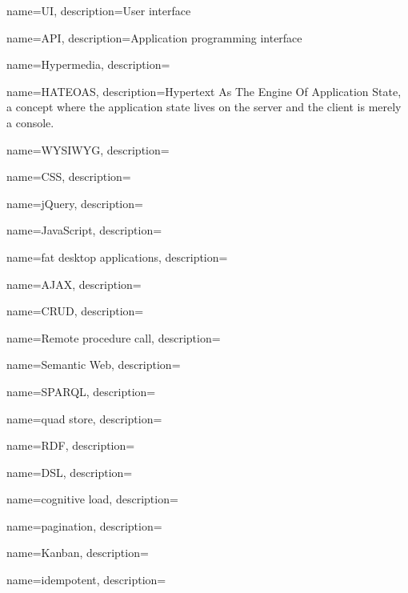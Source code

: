 {
    name={UI},
    description={User interface}
}

{
    name={API},
    description={Application programming interface}
}

{
    name={Hypermedia},
    description={}
}

{
    name={HATEOAS},
    description={Hypertext As The Engine Of Application State, a concept where the application state lives on the server and the client is merely a console.}
}

{
    name={WYSIWYG},
    description={}
}

{
    name={CSS},
    description={}
}

{
    name={jQuery},
    description={}
}

{
    name={JavaScript},
    description={}
}

{
    name={fat desktop applications},
    description={}
}

{
    name={AJAX},
    description={}
}

{
    name={CRUD},
    description={}
}

{
    name={Remote procedure call},
    description={}
}

{
    name={Semantic Web},
    description={}
}

{
    name={SPARQL},
    description={}
}

{
    name={quad store},
    description={}
}

{
    name={RDF},
    description={}
}

{
    name={DSL},
    description={}
}

{
    name={cognitive load},
    description={}
}

{
    name={pagination},
    description={}
}

{
    name={Kanban},
    description={}
}

{
    name={idempotent},
    description={}
}
